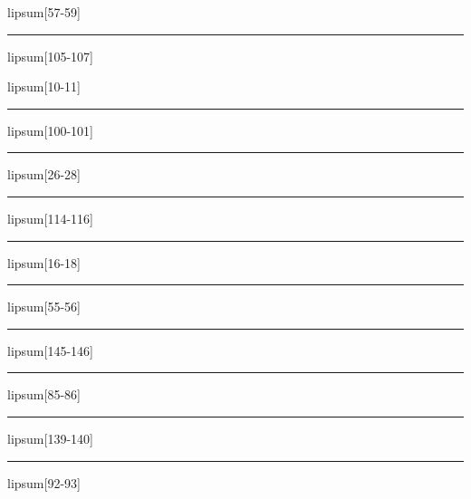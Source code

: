 \documentclass[11pt,a4paper]{article}
\begin{document}
lipsum[57-59]

\begin{simplewrap}
  \textcolor{green!50}{\rule{5.5cm}{9.3cm}}
\end{simplewrap}
lipsum[105-107]

lipsum[10-11]

\begin{simplewrap}
  \textcolor{violet!41}{\rule{3.3cm}{3.9cm}}
\end{simplewrap}
lipsum[100-101]

\begin{simplewrap}
  \textcolor{magenta!36}{\rule{4.8cm}{7.8cm}}
\end{simplewrap}
lipsum[26-28]

\begin{simplewrap}
  \textcolor{olive!27}{\rule{3.1cm}{5.0cm}}
\end{simplewrap}
lipsum[114-116]

\begin{simplewrap}
  \textcolor{lime!16}{\rule{5.9cm}{4.9cm}}
\end{simplewrap}
lipsum[16-18]

\begin{simplewrap}
  \textcolor{yellow!17}{\rule{5.8cm}{8.6cm}}
\end{simplewrap}
lipsum[55-56]

\begin{simplewrap}
  \textcolor{red!13}{\rule{5.4cm}{3.9cm}}
\end{simplewrap}
lipsum[145-146]

\begin{simplewrap}
  \textcolor{magenta!23}{\rule{4.8cm}{8.5cm}}
\end{simplewrap}
lipsum[85-86]

\begin{simplewrap}
  \textcolor{red!27}{\rule{5.6cm}{3.2cm}}
\end{simplewrap}
lipsum[139-140]

\begin{simplewrap}
  \textcolor{cyan!17}{\rule{5.0cm}{2.2cm}}
\end{simplewrap}
lipsum[92-93]
\end{document}
